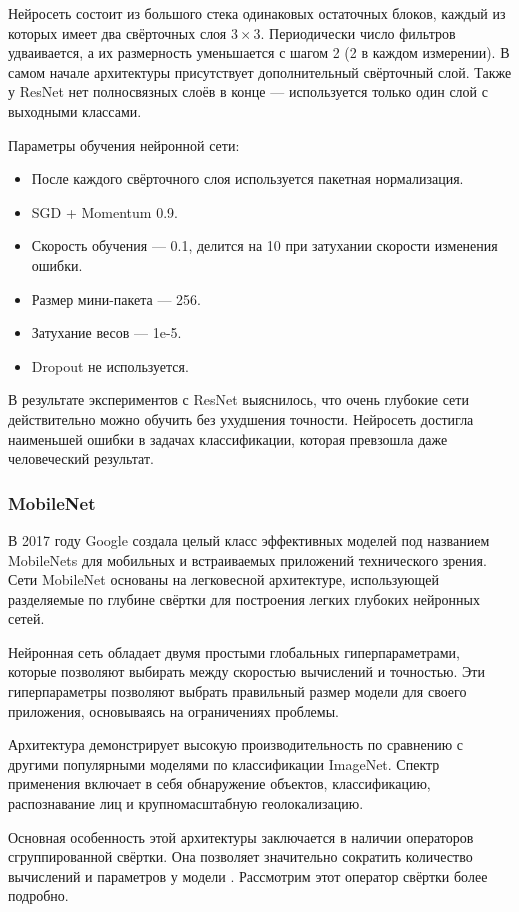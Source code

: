 Нейросеть состоит из большого стека одинаковых остаточных блоков, каждый из которых имеет два свёрточных слоя $3 \times 3$. Периодически число фильтров удваивается, а их размерность уменьшается с шагом 2 (2 в каждом измерении). В самом начале архитектуры присутствует дополнительный свёрточный слой. Также у ResNet нет полносвязных слоёв в конце — используется только один слой с выходными классами.

Параметры обучения нейронной сети:
\begin{itemize}[wide]
    \item После каждого свёрточного слоя используется пакетная нормализация.
    \item SGD + Momentum 0.9.
    \item Скорость обучения — 0.1, делится на 10 при затухании скорости изменения ошибки.
    \item Размер мини-пакета — 256.
    \item Затухание весов — 1e-5.
    \item Dropout не используется.
\end{itemize}

В результате экспериментов с ResNet выяснилось, что очень глубокие сети действительно можно обучить без ухудшения точности. Нейросеть достигла наименьшей ошибки в задачах классификации, которая превзошла даже человеческий результат.

\subsubsection{MobileNet} \label{mobilenet_rev}
В 2017 году Google создала целый класс эффективных моделей под названием MobileNets для мобильных и встраиваемых приложений технического зрения. Сети MobileNet основаны на легковесной архитектуре, использующей разделяемые по глубине свёртки для построения легких глубоких нейронных сетей. 

Нейронная сеть обладает двумя простыми глобальных гиперпараметрами, которые позволяют выбирать между скоростью вычислений и точностью. Эти гиперпараметры позволяют выбрать правильный размер модели для своего приложения, основываясь на ограничениях проблемы. 

Архитектура демонстрирует высокую производительность по сравнению с другими популярными моделями по классификации ImageNet. Спектр применения включает в себя обнаружение объектов, классификацию, распознавание лиц и крупномасштабную геолокализацию\cite{mobilenet}.

Основная особенность этой архитектуры заключается в наличии операторов сгруппированной свёртки. Она позволяет значительно сократить количество вычислений и параметров у модели \cite{xception}. Рассмотрим этот оператор свёртки более подробно.

